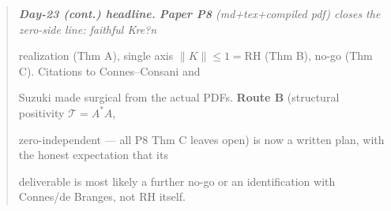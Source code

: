 \documentclass[10pt]{article}
\begin{document}
\begin{quote}\itshape
\textbf{Day-23 (cont.) headline.} \textbf{Paper P8} (md+tex+compiled pdf) closes the zero-side line: faithful Kre?n\par
realization (Thm A), single axis $\|K\|\le1=$RH (Thm B), no-go (Thm C). Citations to Connes--Consani and\par
Suzuki made surgical from the actual PDFs. \textbf{Route B} (structural positivity $\mathcal T=A^*A$,\par
zero-independent --- all P8 Thm C leaves open) is now a written plan, with the honest expectation that its\par
deliverable is most likely a further no-go or an identification with Connes/de Branges, not RH itself.\par
\end{quote}
\end{document}
